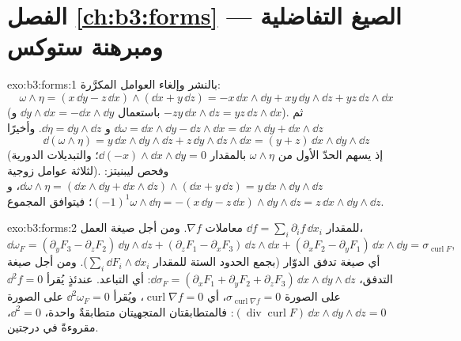 \section*{الفصل \ref{ch:b3:forms} --- الصيغ التفاضلية ومبرهنة
ستوكس}

\begin{solution}{exo:b3:forms:1}
بالنشر وإلغاء العوامل المكرَّرة:
\[
\omega\wedge\eta = (x\,\dd y - z\,\dd x)\wedge(\dd x +
y\,\dd z)
= -x\,\dd x\wedge\dd y + xy\,\dd y\wedge\dd z +
yz\,\dd z\wedge\dd x
\]
(باستعمال $\dd y\wedge\dd x = -\dd x\wedge\dd y$ و $-zy\,\dd
x\wedge\dd z = yz\,\dd z\wedge\dd x$). ثم $\dd\omega =
\dd x\wedge\dd y - \dd z\wedge\dd x = \dd x\wedge\dd y +
\dd x\wedge\dd z$ و $\dd\eta = \dd y\wedge\dd z$. وأخيرًا
\[
\dd(\omega\wedge\eta) = y\,\dd x\wedge\dd y\wedge\dd z +
z\,\dd y\wedge\dd z\wedge\dd x = (y + z)\,\dd x\wedge\dd
y\wedge\dd z
\]
(إذ يسهم الحدّ الأول من $\omega\wedge\eta$ بالمقدار $\dd(-x)
\wedge\dd x\wedge\dd y = 0$؛ والتبديلات
الدورية لثلاثة عوامل زوجية). وفحص ليبنيتز: $\dd\omega\wedge\eta =
(\dd x\wedge\dd y + \dd x\wedge\dd z)\wedge(\dd x + y\,\dd
z) = y\,\dd x\wedge\dd y\wedge\dd z$، و
$(-1)^1\omega\wedge\dd\eta = -(x\,\dd y - z\,\dd
x)\wedge\dd y\wedge\dd z = z\,\dd x\wedge\dd y\wedge\dd z$؛
فيتوافق المجموع.
\end{solution}

\begin{solution}{exo:b3:forms:2}
للمقدار $\dd f = \sum_i\partial_if\,\dd x_i$ معاملات $\nabla f$. ومن أجل صيغة العمل،
\[
\dd\omega_F = (\partial_yF_3 - \partial_zF_2)\,\dd y\wedge\dd
z + (\partial_zF_1 - \partial_xF_3)\,\dd z\wedge\dd x +
(\partial_xF_2 - \partial_yF_1)\,\dd x\wedge\dd y =
\sigma_{\operatorname{curl}F},
\]
أي صيغة تدفق الدوّار (بجمع الحدود الستة للمقدار $\sum_i\dd F_i\wedge\dd x_i$). ومن
أجل صيغة التدفق، $\dd\sigma_F = (\partial_xF_1 + \partial_yF_2 +
\partial_zF_3)\,\dd x\wedge\dd y\wedge\dd z$: أي التباعد. عندئذٍ يُقرأ $\dd^2f = 0$
على الصورة $\sigma_{\operatorname{curl}\nabla f} = 0$، أي $\operatorname{curl}\nabla f = 0$، ويُقرأ $\dd^2\omega_F = 0$ على الصورة $(\operatorname{div}\operatorname{curl}F)\,\dd
x\wedge\dd y\wedge\dd z = 0$:
فالمتطابقتان المتجهيتان متطابقةٌ واحدة، $\dd^2 = 0$، مقروءةً
في درجتين.
\end{solution}

